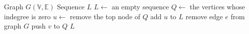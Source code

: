 \begin{algorithmic}[1]
  \REQUIRE Graph $G(\mathbb{V}, \mathbb{E})$
  \ENSURE Sequence $L$
  \STATE $L \leftarrow$ an empty sequence
  \STATE $Q \leftarrow$ the vertices whose indegree is zero
    \STATE $u \leftarrow$ remove the top node of $Q$
    \STATE add $u$ to $L$
      \STATE remove edge $e$ from graph $G$
        \STATE push $v$ to $Q$
      \ENDIF
    \ENDFOR
  \ENDWHILE
  \RETURN $L$
\end{algorithmic}
